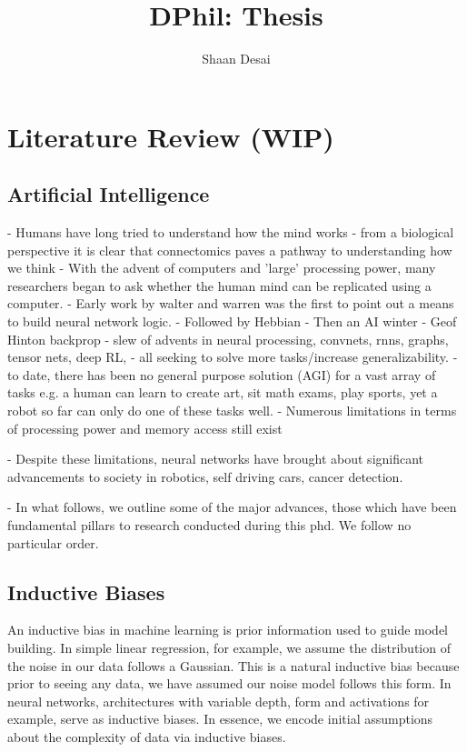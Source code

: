 \documentclass{article}
\title{DPhil: Thesis}
\author{Shaan Desai }
\begin{document}
\maketitle


\tableofcontents


\section{Literature Review (WIP)}

\subsection{Artificial Intelligence}

- Humans have long tried to understand how the mind works
- from a biological perspective it is clear that connectomics paves a pathway to understanding how we think
- With the advent of computers and 'large' processing power, many researchers began to ask whether the human mind can be replicated using a computer.
- Early work by walter and warren was the first to point out a means to build neural network logic.
- Followed by Hebbian
- Then an AI winter
- Geof Hinton backprop
- slew of advents in neural processing, convnets, rnns, graphs, tensor nets, deep RL, 
- all seeking to solve more tasks/increase generalizability.
- to date, there has been no general purpose solution (AGI) for a vast array of tasks e.g. a human can learn to create art, sit math exams, play sports, yet a robot so far can only do one of these tasks well.
- Numerous limitations in terms of processing power and memory access still exist

- Despite these limitations, neural networks have brought about significant advancements to society in robotics, self driving cars, cancer detection.

- In what follows, we outline some of the major advances, those which have been fundamental pillars to research conducted during this phd. We follow no particular order.

\subsection{Inductive Biases}

An inductive bias in machine learning is prior information used to guide model building. In simple linear regression, for example, we assume the distribution of the noise in our data follows a Gaussian. This is a natural inductive bias because prior to seeing any data, we have assumed our noise model follows this form. In neural networks, architectures with variable depth, form and activations for example, serve as inductive biases. In essence, we encode initial assumptions about the complexity of data via inductive biases. 
\end{document}
